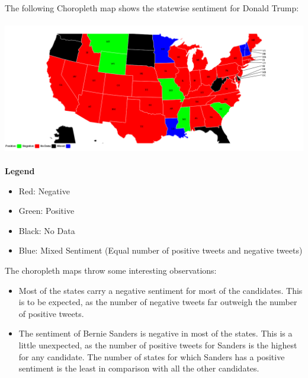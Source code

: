 \documentclass[twoside]{article}
\begin{document}
\begin{multicols}{2}
The following Choropleth map shows the statewise sentiment for Donald Trump: \\ \\
\includegraphics[width=1\columnwidth]{trump-chor} \\ \\

\textbf{Legend}
\begin{itemize}
\item Red: Negative
\item Green: Positive
\item Black: No Data
\item Blue: Mixed Sentiment (Equal number of positive tweets and negative tweets)
\end{itemize}

The choropleth maps throw some interesting observations: \\
\begin{itemize}
\item
Most of the states carry a negative sentiment for most of the candidates. This is to be expected, as the number of negative tweets far outweigh the number of positive tweets.
\item
The sentiment of Bernie Sanders is negative in most of the states. This is a little unexpected, as the number of positive tweets for Sanders is the highest for any candidate. The number of states for which Sanders has a positive sentiment is the least in comparison with all the other candidates.
\end{itemize}



\end{multicols}
\end{document}
